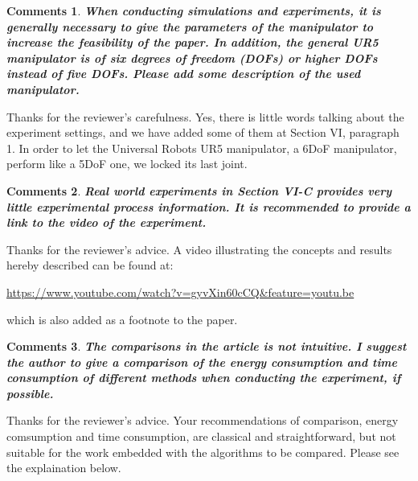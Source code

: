 \documentclass[utf8]{article}
\newtheorem{theorem}{Comments}[section]
\begin{document}
\begin{theorem}
\textbf{When conducting simulations and experiments, it is generally necessary to give the parameters of the manipulator to increase the feasibility of the paper. In addition, the general UR5 manipulator is of six degrees of freedom (DOFs) or higher DOFs instead of five DOFs. Please add some description of the used manipulator. }
\end{theorem}

Thanks for the reviewer's carefulness. Yes, there is little words talking about the experiment settings, and we have added some of them at Section VI, paragraph 1. 
In order to let the Universal Robots UR5 manipulator, a 6DoF manipulator, perform like a 5DoF one, we locked its last joint. 



\begin{theorem}
\textbf{Real world experiments in Section VI-C provides very little experimental process information. It is recommended to provide a link to the video of the experiment.}
\end{theorem}

Thanks for the reviewer's advice. A video illustrating the concepts and results hereby described can be found at: 

\url{https://www.youtube.com/watch?v=gyvXin60cCQ\&feature=youtu.be}

\noindent
which is also added as a footnote to the paper. 

\begin{theorem}
\textbf{The comparisons in the article is not intuitive. I suggest the author to give a comparison of the energy consumption and time consumption of different methods when conducting the experiment, if possible.}
\end{theorem}

Thanks for the reviewer's advice. Your recommendations of comparison, energy comsumption and time consumption, are classical and straightforward, but not suitable for the work embedded with the algorithms to be compared. Please see the explaination below. 
\end{document}

